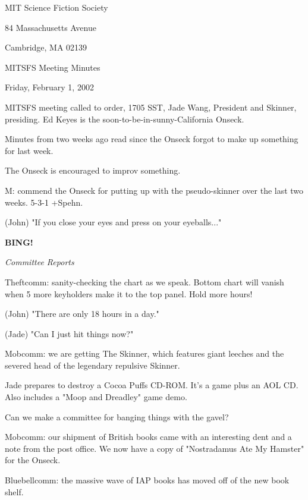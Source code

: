 \documentclass[12pt]{article}
\newcommand{\bing}{{\bf BING!} }
\newcommand{\goto}[1]{\bing \vskip 12pt \centerline{{\em{#1}}}}
\begin{document}
\begin{center}

MIT Science Fiction Society 

84 Massachusetts Avenue

Cambridge, MA 02139

\vspace{12pt}

MITSFS Meeting Minutes 

Friday, February 1, 2002

\end{center}
 
\vspace{18pt}

\setlength{\parskip}{6pt}

\noindent
MITSFS meeting called to order, 1705 SST, Jade Wang, President and Skinner, presiding.  Ed Keyes is the soon-to-be-in-sunny-California Onseck.

Minutes from two weeks ago read since the Onseck forgot to make up something for last week.

The Onseck is encouraged to improv something.

M: commend the Onseck for putting up with the pseudo-skinner over the last two weeks. 5-3-1 +Spehn.

(John) "If you close your eyes and press on your eyeballs..."

\goto{Committee Reports}

Theftcomm: sanity-checking the chart as we speak. Bottom chart will vanish when 5 more keyholders make it to the top panel. Hold more hours!

(John) "There are only 18 hours in a day."

(Jade) "Can I just hit things now?"

Mobcomm: we are getting The Skinner, which features giant leeches and the severed head of the legendary repulsive Skinner.

Jade prepares to destroy a Cocoa Puffs CD-ROM. It's a game plus an AOL CD. Also includes a "Moop and Dreadley" game demo.

Can we make a committee for banging things with the gavel?

Mobcomm: our shipment of British books came with an interesting dent and a note from the post office. We now have a copy of "Nostradamus Ate My Hamster" for the Onseck.

Bluebellcomm: the massive wave of IAP books has moved off of the new book shelf.
\end{document}
